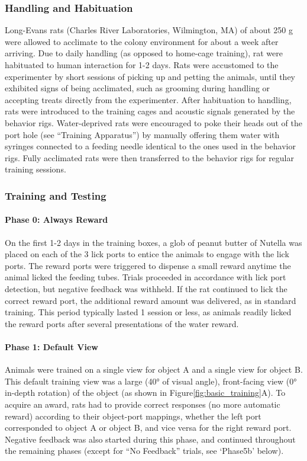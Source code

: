 \subsubsection{Handling and Habituation}
Long-Evans rats (Charles River Laboratories, Wilmington, MA) of about 250 g were allowed to acclimate to the colony environment for about a week after arriving. Due to daily handling (as opposed to home-cage training), rat were habituated to human interaction for 1-2 days. Rats were accustomed to the experimenter by short sessions of picking up and petting the animals, until they exhibited signs of being acclimated, such as grooming during handling or accepting treats directly from the experimenter. After habituation to handling, rats were introduced to the training cages and acoustic signals generated by the behavior rigs. Water-deprived rats were encouraged to poke their heads out of the port hole (see ``Training Apparatus'') by manually offering them water with syringes connected to a feeding needle identical to the ones used in the behavior rigs. Fully acclimated rats were then transferred to the behavior rigs for regular training sessions.

\subsubsection{Training and Testing}
\paragraph{Phase 0: Always Reward}
On the first 1-2 days in the training boxes, a glob of peanut butter of Nutella was placed on each of the 3 lick ports to entice the animals to engage with the lick ports. The reward ports were triggered to dispense a small reward anytime the animal licked the feeding tubes. Trials proceeded in accordance with lick port detection, but negative feedback was withheld. If the rat continued to lick the correct reward port, the additional reward amount was delivered, as in standard training. This period typically lasted 1 session or less, as animals readily licked the reward ports after several presentations of the water reward.

\paragraph{Phase 1: Default View}
Animals were trained on a single view for object A and a single view for object B. This default training view was a large (\ang{40} of visual angle), front-facing view (\ang{0} in-depth rotation) of the object (as shown in Figure\ref{fig:basic_training}A). To acquire an award, rats had to provide correct responses (no more automatic reward) according to their object-port mappings, whether the left port corresponded to object A or object B, and vice versa for the right reward port. Negative feedback was also started during this phase, and continued throughout the remaining phases (except for ``No Feedback'' trials, see `Phase5b' below). 


